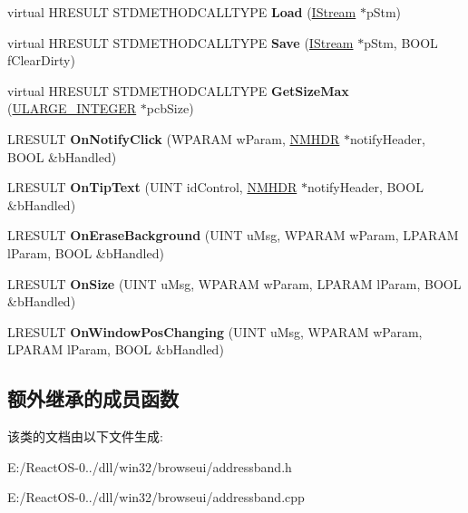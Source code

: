 \begin{DoxyCompactItemize}
\item 
\mbox{\label{class_c_address_band_a716cb7ee8431bb9a2a14704934ae907a}} 
virtual H\+R\+E\+S\+U\+LT S\+T\+D\+M\+E\+T\+H\+O\+D\+C\+A\+L\+L\+T\+Y\+PE {\bfseries Load} (\hyperlink{interface_i_stream}{I\+Stream} $\ast$p\+Stm)
\item 
\mbox{\label{class_c_address_band_ae5a6c9b3bb1c0733ee3d5926e136d245}} 
virtual H\+R\+E\+S\+U\+LT S\+T\+D\+M\+E\+T\+H\+O\+D\+C\+A\+L\+L\+T\+Y\+PE {\bfseries Save} (\hyperlink{interface_i_stream}{I\+Stream} $\ast$p\+Stm, B\+O\+OL f\+Clear\+Dirty)
\item 
\mbox{\label{class_c_address_band_a14ba1780ba5374d136e07bb2ed486cd4}} 
virtual H\+R\+E\+S\+U\+LT S\+T\+D\+M\+E\+T\+H\+O\+D\+C\+A\+L\+L\+T\+Y\+PE {\bfseries Get\+Size\+Max} (\hyperlink{struct___u_l_a_r_g_e___i_n_t_e_g_e_r}{U\+L\+A\+R\+G\+E\+\_\+\+I\+N\+T\+E\+G\+ER} $\ast$pcb\+Size)
\item 
\mbox{\label{class_c_address_band_aacb33614dfc162245eda3d63797847f9}} 
L\+R\+E\+S\+U\+LT {\bfseries On\+Notify\+Click} (W\+P\+A\+R\+AM w\+Param, \hyperlink{structtag_n_m_h_d_r}{N\+M\+H\+DR} $\ast$notify\+Header, B\+O\+OL \&b\+Handled)
\item 
\mbox{\label{class_c_address_band_a2cd2821ffd2f4a1a37c8bd2e0c87e23b}} 
L\+R\+E\+S\+U\+LT {\bfseries On\+Tip\+Text} (U\+I\+NT id\+Control, \hyperlink{structtag_n_m_h_d_r}{N\+M\+H\+DR} $\ast$notify\+Header, B\+O\+OL \&b\+Handled)
\item 
\mbox{\label{class_c_address_band_a217a24617325e2a23e6df298cf5e0d84}} 
L\+R\+E\+S\+U\+LT {\bfseries On\+Erase\+Background} (U\+I\+NT u\+Msg, W\+P\+A\+R\+AM w\+Param, L\+P\+A\+R\+AM l\+Param, B\+O\+OL \&b\+Handled)
\item 
\mbox{\label{class_c_address_band_aa1b9dba722844f01b5eae020f18aeadd}} 
L\+R\+E\+S\+U\+LT {\bfseries On\+Size} (U\+I\+NT u\+Msg, W\+P\+A\+R\+AM w\+Param, L\+P\+A\+R\+AM l\+Param, B\+O\+OL \&b\+Handled)
\item 
\mbox{\label{class_c_address_band_a9e2b1477d1ebc69ca3e537b0c89afe81}} 
L\+R\+E\+S\+U\+LT {\bfseries On\+Window\+Pos\+Changing} (U\+I\+NT u\+Msg, W\+P\+A\+R\+AM w\+Param, L\+P\+A\+R\+AM l\+Param, B\+O\+OL \&b\+Handled)
\end{DoxyCompactItemize}
\subsection*{额外继承的成员函数}


该类的文档由以下文件生成\+:\begin{DoxyCompactItemize}
\item 
E\+:/\+React\+O\+S-\/0../dll/win32/browseui/addressband.\+h\item 
E\+:/\+React\+O\+S-\/0../dll/win32/browseui/addressband.\+cpp\end{DoxyCompactItemize}
